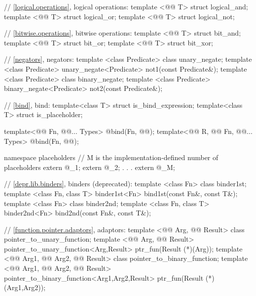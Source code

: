\documentclass[american,twoside]{book}
\begin{document}
\begin{codeblock}
{  // \ref{logical.operations}, logical operations:
  template <@@ T> struct logical_and;
  template <@@ T> struct logical_or;
  template <@@ T> struct logical_not;

  // \ref{bitwise.operations}, bitwise operations:
  template <@@ T> struct bit_and;
  template <@@ T> struct bit_or;
  template <@@ T> struct bit_xor;

  // \ref{negators}, negators:
  template <class Predicate> class unary_negate;
  template <class Predicate>
    unary_negate<Predicate>  not1(const Predicate&);
  template <class Predicate> class binary_negate;
  template <class Predicate>
    binary_negate<Predicate> not2(const Predicate&);

  // \ref{bind}, bind:
  template<class T> struct is_bind_expression;
  template<class T> struct is_placeholder;

  template<@@ Fn, @@... Types>
    @\unspec@ bind(Fn, @@);
  template<@@ R, @@ Fn, @@... Types>
    @\unspec@ bind(Fn, @@);

  namespace placeholders {
    // M is the implementation-defined number of placeholders
    extern @\unspec@ _1;
    extern @\unspec@ _2;
                .
                .
                .
    extern @\unspec@ _M;
  }  

  // \ref{depr.lib.binders}, binders (deprecated):
  template <class Fn> class binder1st;
  template <class Fn, class T>
    binder1st<Fn> bind1st(const Fn&, const T&);
  template <class Fn> class binder2nd;
  template <class Fn, class T>
    binder2nd<Fn> bind2nd(const Fn&, const T&);

  // \ref{function.pointer.adaptors}, adaptors:
  template <@@ Arg, @@ Result> 
    class pointer_to_unary_function;
  template <@@ Arg, @@ Result>
    pointer_to_unary_function<Arg,Result> ptr_fun(Result (*)(Arg));
  template <@@ Arg1, @@ Arg2, @@ Result>
    class pointer_to_binary_function;
  template <@@ Arg1, @@ Arg2, @@ Result>
    pointer_to_binary_function<Arg1,Arg2,Result>
      ptr_fun(Result (*)(Arg1,Arg2));

}
\end{codeblock}
\end{document}
